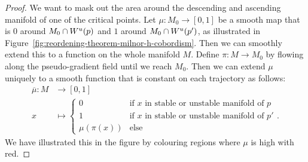 \begin{proof}
    We want to mask out the area around the descending and ascending manifold of one of the critical points.
    Let $\mu: M_0 \to  [0,1]$ be a smooth map that is $0$ around  $ M_0 \cap W^u(p)$ and $1$ around $M_0 \cap W^u(p')$, as illustrated in Figure~\ref{fig:reordening-theorem-milnor-h-cobordism}.
    Then we can smoothly extend this to a function on the whole manifold $M$.
    Define $\pi: M \to  M_0$ by flowing along the pseudo-gradient field until we reach $M_0$.
    Then we can extend $\mu$ uniquely to a smooth function that is constant on each trajectory as follows:
    \begin{align*}
        \overline{\mu}: M &\longrightarrow [0,1] \\
        x &\longmapsto \begin{cases}
            0 & \text{if $x$ in stable or unstable manifold of $p$}\\
            1 & \text{if $x$ in stable or unstable manifold of $p'$}\\ 
            \mu(\pi(x)) & \text{else}
        \end{cases}
    .\end{align*}
    We have illustrated this in the figure by colouring regions where $\mu$ is high with red.


\end{proof}
